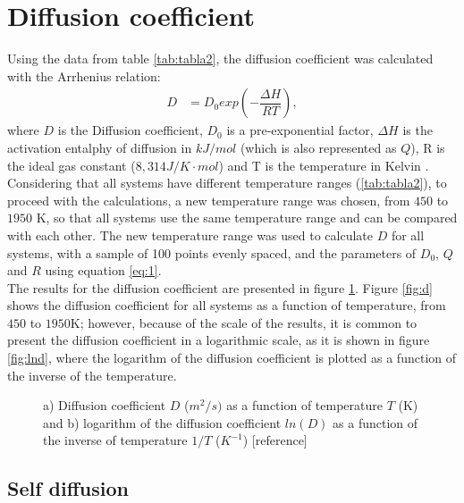 \newpage
\section{Diffusion coefficient}

Using the data from table \ref{tab:tabla2}, the diffusion coefficient was calculated with the Arrhenius relation:
\begin{align}
    \label{eq:1}
    D&=D_0 exp\left(-\dfrac{\Delta H}{RT}\right),
\end{align}
where $D$ is the Diffusion coefficient, $D_0$ is a pre-exponential factor, $\Delta H$ is the activation entalphy of diffusion in $k J/mol$ (which is also represented as $Q$), R is the ideal gas constant ($8,314 J/K\cdot mol$) and T is the temperature in Kelvin \cite{diff}. \\

Considering that all systems have different temperature ranges (\ref{tab:tabla2}), to proceed with the calculations, a new temperature range was chosen, from $450$ to $1950$ K, so that all systems use the same temperature range and can be compared with each other. The new temperature range was used to calculate $D$ for all systems, with a sample of 100 points evenly spaced, and the parameters of $D_0$, $Q$ and $R$ using equation \eqref{eq:1}. \\

The results for the diffusion coefficient are presented in figure \ref{fig:diffusion}. Figure \ref{fig:d} shows the diffusion coefficient for all systems as a function of temperature, from $450$ to $1950$K; however, because of the scale of the results, it is common to present the diffusion coefficient in a logarithmic scale, as it is shown in figure \ref{fig:lnd}, where the logarithm of the diffusion coefficient is plotted as a function of the inverse of the temperature.

\begin{figure}[h]
 \centering
 \captionsetup{justification=centering,margin=2cm}
 \caption{a) Diffusion coefficient $D$ ($m^2/s)$ as a function of temperature $T$ (K) and b) logarithm of the diffusion coefficient $ln(D)$ as a function of the inverse of temperature $1/T$ ($K^{-1}$) [reference]}
 \label{fig:diffusion}
\end{figure}


\newpage
\subsection{Self diffusion}

